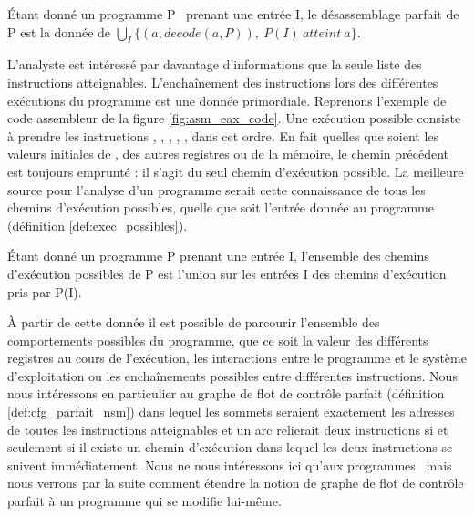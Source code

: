 \begin{defi}
 Étant donné un programme P \nsm\ prenant une entrée I, le désassemblage parfait de P est la donnée de $\bigcup_{I} \{(a, decode(a, P)),\ P(I)\ atteint\ a\}$.
\label{def:desassemblage_parfait_nsm}
\end{defi}

L'analyste est intéressé par davantage d'informations que la seule liste des instructions atteignables.
L'enchaînement des instructions lors des différentes exécutions du programme est une donnée primordiale.
Reprenons l'exemple de code assembleur de la figure \ref{fig:asm_eax_code}. Une exécution possible consiste à prendre les instructions , , , , ,  dans cet ordre. En fait quelles que soient les valeurs initiales de \eax, des autres registres ou de la mémoire, le chemin précédent est toujours emprunté : il s'agit du seul chemin d'exécution possible.
La meilleure source pour l'analyse d'un programme serait cette connaissance de tous les chemins d'exécution possibles, quelle que soit l'entrée donnée au programme (définition \ref{def:exec_possibles}).

\begin{defi}
 Étant donné un programme P prenant une entrée I, l'ensemble des chemins d'exécution possibles de P est l'union sur les entrées I des chemins d'exécution pris par P(I).
\label{def:exec_possibles}
\end{defi}

À partir de cette donnée il est possible de parcourir l'ensemble des comportements possibles du programme, que ce soit la valeur des différents registres au cours de l'exécution, les interactions entre le programme et le système d'exploitation ou les enchaînements possibles entre différentes instructions.
Nous nous intéressons en particulier au graphe de flot de contrôle parfait (définition \ref{def:cfg_parfait_nsm}) dans lequel les sommets seraient exactement les adresses de toutes les instructions atteignables et un arc relierait deux instructions si et seulement si il existe un chemin d'exécution dans lequel les deux instructions se suivent immédiatement.
Nous ne nous intéressons ici qu'aux programmes \nsms\ mais nous verrons par la suite comment étendre la notion de graphe de flot de contrôle parfait à un programme qui se modifie lui-même.

